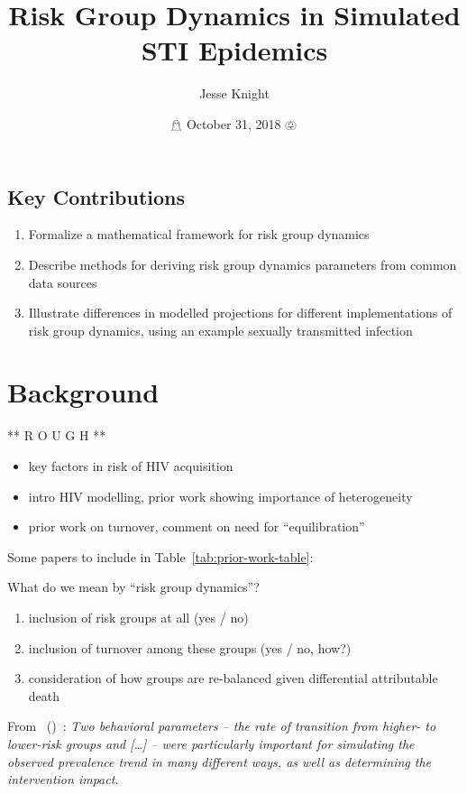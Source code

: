 \documentclass{article}
\title{Risk Group Dynamics in Simulated STI Epidemics}
\author{Jesse Knight}
\date{$\mathghost$ October 31, 2018 $\pumpkin$}
\numberwithin{equation}{section}
\newcommand{\citet}[1]{\citeauthor{#1}~(\citeyear{#1})~\cite{#1}}
\begin{document}
\maketitle
\tableofcontents
\subsection*{Key Contributions}
\begin{enumerate}
  \item Formalize a mathematical framework for risk group dynamics
  \item Describe methods for deriving risk group dynamics parameters from common data sources
  \item Illustrate differences in modelled projections for different implementations of risk group dynamics,
  using an example sexually transmitted infection
\end{enumerate}
\clearpage
\section{Background}\label{s:background}
** R O U G H **
\begin{itemize}
  \item key factors in risk of HIV acquisition
  \item intro HIV modelling, prior work showing importance of heterogeneity
  \item prior work on turnover, comment on need for ``equilibration''
\end{itemize}
Some papers to include in Table~\ref{tab:prior-work-table}:
\cite{Barnighausen2012,Cremin2013,Eaton2014,Estill2012,Granich2009,Hallett2008,Johnson2006,Phillips2011,Rosenberg2004,Shah2016}
\par
What do we mean by ``risk group dynamics''?
\begin{enumerate}
  \item inclusion of risk groups at all (yes / no)
  \item inclusion of turnover among these groups (yes / no, how?)
  \item consideration of how groups are re-balanced given differential attributable death
\end{enumerate}
\par
From \citet{Eaton2014}:
\textit{Two behavioral parameters
-- the rate of transition from higher- to lower-risk groups and \textup{[\dots]} -- 
were particularly important for simulating the observed prevalence trend in many different ways,
as well as determining the intervention impact.}
\end{document}
